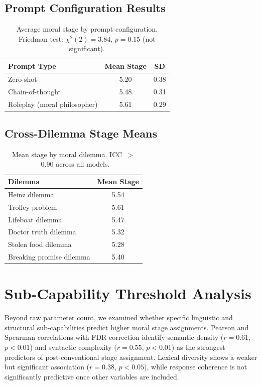 \documentclass{article}
\begin{document}
\subsection*{Prompt Configuration Results}

\begin{table}[h]
\centering
\caption{Average moral stage by prompt configuration. Friedman test: $\chi^2(2) = 3.84$, $p = 0.15$ (not significant).}
\label{tab:prompt_results}
\begin{tabular}{lcc}
\toprule
Prompt Type & Mean Stage & SD \\
\midrule
Zero-shot                  & 5.20 & 0.38 \\
Chain-of-thought           & 5.48 & 0.31 \\
Roleplay (moral philosopher) & 5.61 & 0.29 \\
\bottomrule
\end{tabular}
\end{table}

\subsection*{Cross-Dilemma Stage Means}

\begin{table}[h]
\centering
\caption{Mean stage by moral dilemma. ICC~$>$~0.90 across all models.}
\label{tab:dilemma_results}
\begin{tabular}{lc}
\toprule
Dilemma & Mean Stage \\
\midrule
Heinz dilemma            & 5.54 \\
Trolley problem          & 5.61 \\
Lifeboat dilemma         & 5.47 \\
Doctor truth dilemma     & 5.32 \\
Stolen food dilemma      & 5.28 \\
Breaking promise dilemma & 5.40 \\
\bottomrule
\end{tabular}
\end{table}

\section{Sub-Capability Threshold Analysis}
\label{app:analysis9}

Beyond raw parameter count, we examined whether specific linguistic and structural sub-capabilities predict higher moral stage assignments. Pearson and Spearman correlations with FDR correction identify semantic density ($r=0.61$, $p<0.01$) and syntactic complexity ($r=0.55$, $p<0.01$) as the strongest predictors of post-conventional stage assignment. Lexical diversity shows a weaker but significant association ($r=0.38$, $p<0.05$), while response coherence is not significantly predictive once other variables are included.
\end{document}
